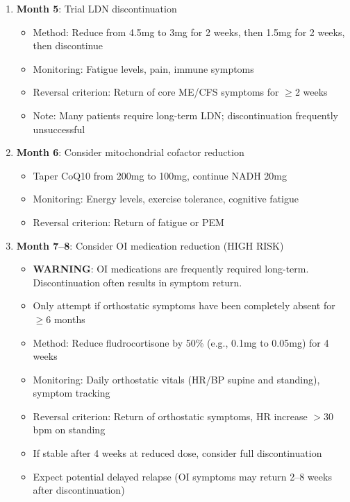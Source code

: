 \begin{protocol}
\begin{enumerate}
    \item \textbf{Month 5}: Trial LDN discontinuation
    \begin{itemize}
        \item Method: Reduce from 4.5mg to 3mg for 2 weeks, then 1.5mg for 2 weeks, then discontinue
        \item Monitoring: Fatigue levels, pain, immune symptoms
        \item Reversal criterion: Return of core ME/CFS symptoms for $\geq$2 weeks
        \item Note: Many patients require long-term LDN; discontinuation frequently unsuccessful
    \end{itemize}

    \item \textbf{Month 6}: Consider mitochondrial cofactor reduction
    \begin{itemize}
        \item Taper CoQ10 from 200mg to 100mg, continue NADH 20mg
        \item Monitoring: Energy levels, exercise tolerance, cognitive fatigue
        \item Reversal criterion: Return of fatigue or PEM
    \end{itemize}

    \item \textbf{Month 7--8}: Consider OI medication reduction (HIGH RISK)
    \begin{itemize}
        \item \textbf{WARNING}: OI medications are frequently required long-term. Discontinuation often results in symptom return.
        \item Only attempt if orthostatic symptoms have been completely absent for $\geq$6 months
        \item Method: Reduce fludrocortisone by 50\% (e.g., 0.1mg to 0.05mg) for 4 weeks
        \item Monitoring: Daily orthostatic vitals (HR/BP supine and standing), symptom tracking
        \item Reversal criterion: Return of orthostatic symptoms, HR increase $>30$ bpm on standing
        \item If stable after 4 weeks at reduced dose, consider full discontinuation
        \item Expect potential delayed relapse (OI symptoms may return 2--8 weeks after discontinuation)
    \end{itemize}
\end{enumerate}


\end{protocol}

